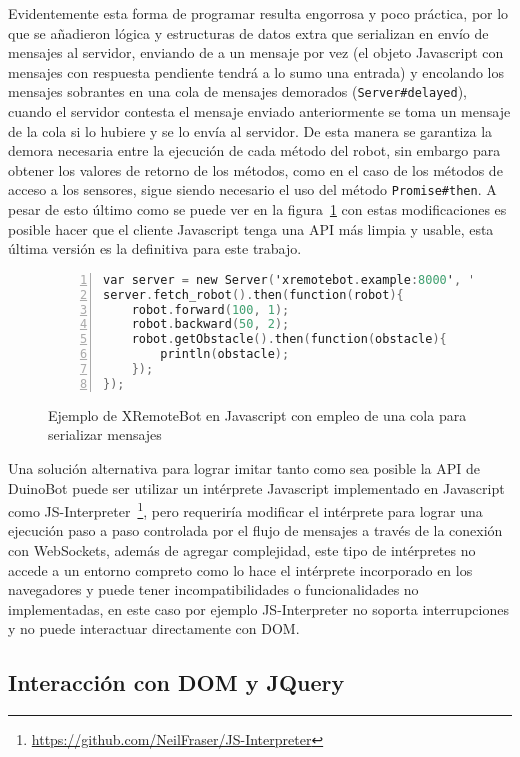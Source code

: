 Evidentemente esta forma de programar resulta engorrosa y poco práctica,
por lo que se añadieron
lógica y estructuras de datos extra que serializan en envío de mensajes al
servidor, enviando de a un mensaje por vez (el objeto Javascript con
mensajes con respuesta pendiente tendrá a lo sumo una entrada)
y encolando los mensajes sobrantes
en una cola de mensajes demorados (\texttt{Server\#delayed}), cuando
el servidor contesta el mensaje enviado anteriormente se toma un mensaje
de la cola si lo hubiere y se lo envía al servidor. De esta manera
se garantiza la demora necesaria entre la ejecución de cada método
del robot, sin embargo para obtener los valores de retorno de los métodos,
como en el caso de los métodos de acceso a los sensores, sigue siendo
necesario el uso del método \texttt{Promise\#then}. A pesar de esto último
como se puede ver en la figura~\ref{lst:ejemplo_xremotebot_javascript_cola}
con estas modificaciones es posible hacer que el cliente Javascript
tenga una API más limpia y usable, esta última versión es la definitiva
para este trabajo.


\begin{figure}
    \begin{lstlisting}[language=C,numbers=left]
var server = new Server('xremotebot.example:8000', 'api-key');
server.fetch_robot().then(function(robot){
    robot.forward(100, 1);
    robot.backward(50, 2);
    robot.getObstacle().then(function(obstacle){
        println(obstacle);
    });
});
    \end{lstlisting}
    \caption{Ejemplo de XRemoteBot en Javascript con empleo de una cola para
             serializar mensajes}
    \label{lst:ejemplo_xremotebot_javascript_cola}
\end{figure}


Una solución alternativa para lograr imitar tanto como sea posible la
API de DuinoBot puede ser utilizar un intérprete Javascript implementado en
Javascript como
JS-Interpreter~\footnote{\url{https://github.com/NeilFraser/JS-Interpreter}},
pero requeriría modificar el intérprete para lograr una ejecución paso a paso
controlada por el flujo de mensajes a través de la conexión con WebSockets,
además de agregar complejidad, este tipo de intérpretes no accede a un entorno
compreto como lo hace el intérprete incorporado en los navegadores y puede
tener incompatibilidades o funcionalidades no implementadas, en este caso
por ejemplo JS-Interpreter no soporta interrupciones y no puede interactuar
directamente con DOM.

\subsection{Interacción con DOM y JQuery}

